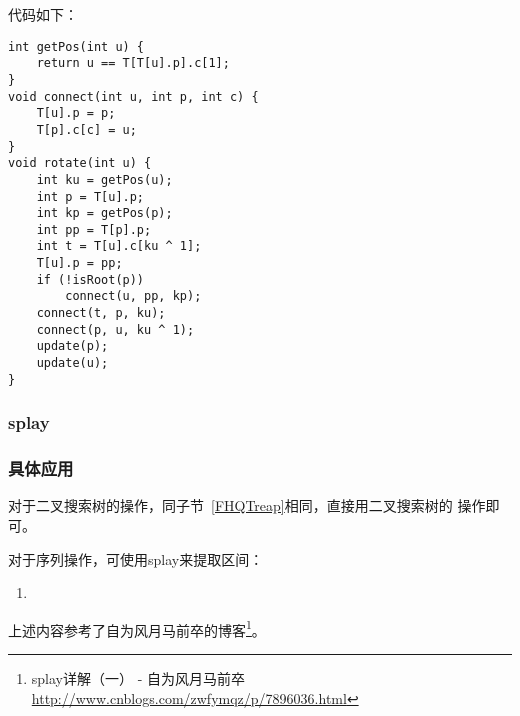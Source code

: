 代码如下：


\begin{lstlisting}[title=rotate]
int getPos(int u) {
    return u == T[T[u].p].c[1];
}
void connect(int u, int p, int c) {
    T[u].p = p;
    T[p].c[c] = u;
}
void rotate(int u) {
    int ku = getPos(u);
    int p = T[u].p;
    int kp = getPos(p);
    int pp = T[p].p;
    int t = T[u].c[ku ^ 1];
    T[u].p = pp;
    if (!isRoot(p))
        connect(u, pp, kp);
    connect(t, p, ku);
    connect(p, u, ku ^ 1);
    update(p);
    update(u);
}
\end{lstlisting}

\subsubsection{splay}

\subsubsection{具体应用}

对于二叉搜索树的操作，同子节~\ref{FHQTreap}相同，直接用二叉搜索树的
操作即可。

对于序列操作，可使用splay来提取区间：

\begin{enumerate}
    \item
\end{enumerate}

上述内容参考了自为风月马前卒的博客\footnote{splay详解（一） - 自为风月马前卒
\url{http://www.cnblogs.com/zwfymqz/p/7896036.html}}。
